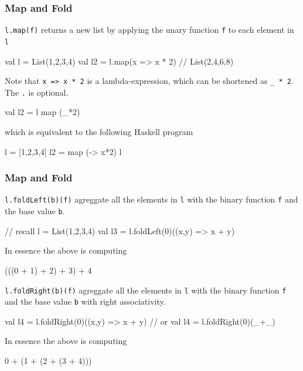 \documentclass{beamer}
\newcommand{\beb}{\begin{exampleblock}}
\newcommand{\eeb}{\end{exampleblock}}
\begin{document}
\begin{frame}[fragile]
\frametitle{Map and Fold}
{\tt l.map(f)} returns a new list by applying the unary function {\tt f} to each
element in {\tt l}
\beb{}
\begin{code}
val l = List(1,2,3,4)
val l2 = l.map(x => x * 2) // List(2,4,6,8)
\end{code}
\eeb
%
Note that {\tt x => x * 2} is a lambda-expression, which can be
shortened as {\tt \_ * 2}. The {\tt .} is optional.
\beb{}
\begin{code}
val l2 = l map (_*2) 
\end{code}
\eeb
which is equivalent to the following Haskell program
\beb{}
\begin{code}
l = [1,2,3,4]
l2 = map (\x -> x*2) l
\end{code}
\eeb
\end{frame}

\begin{frame}[fragile]
\frametitle{Map and Fold}

{\tt l.foldLeft(b)(f)} agreggate all the
elements in {\tt l} with the binary function {\tt f} and the base value
{\tt b}.
\beb{}
\begin{code}
// recall l = List(1,2,3,4)
val l3 = l.foldLeft(0)((x,y) => x + y)
\end{code}
\eeb
In essence the above is computing 
\begin{code}
(((0 + 1) + 2) + 3) + 4
\end{code}
{\tt l.foldRight(b)(f)} agreggate all the
elements in {\tt l} with the binary function {\tt f} and the base value
{\tt b} with right associativity.
\beb{}
\begin{code}
val l4 = l.foldRight(0)((x,y) => x + y) 
// or val l4 =  l.foldRight(0)(_+_) 
\end{code}
\eeb
In essence the above is computing 
\begin{code}
0 + (1 + (2 + (3 + 4)))
\end{code}

\end{frame}
\end{document}
